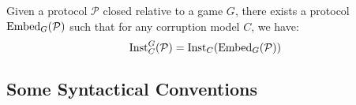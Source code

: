 \begin{lemma}
  Given a protocol $\mathcal{P}$ closed relative to a game $G$,
  there exists a protocol $\text{Embed}_G(\mathcal{P})$ such that for any
  corruption model $C$, we have:
  $$
  \text{Inst}^G_C(\mathcal{P}) = \text{Inst}_C(\text{Embed}_G(\mathcal{P}))
  $$

\end{lemma}

\subsection{Some Syntactical Conventions}
